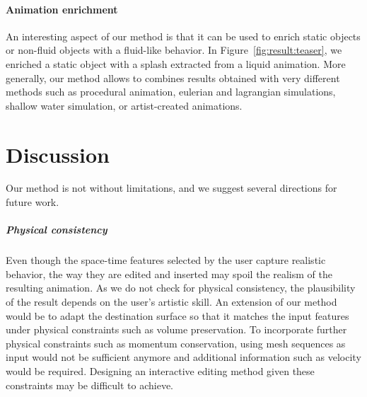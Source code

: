 \documentclass[review]{acmsiggraph}
\begin{document}
\paragraph{Animation enrichment}

An interesting aspect of our method is that it can be used to enrich static objects or non-fluid objects with a fluid-like behavior. 
In Figure~\ref{fig:result:teaser}, we enriched a static object with a splash extracted from a liquid animation.
More generally, our method allows to combines results obtained with very different methods such as procedural animation, eulerian and lagrangian simulations, shallow water simulation, or artist-created animations.




\section{Discussion} \label{sec:discussion}

Our method is not without limitations, and we suggest several directions for future work.

\subparagraph{Physical consistency} 
Even though the space-time features selected by the user capture realistic behavior, the way they are edited and inserted may spoil the realism of the resulting animation. 
As we do not check for physical consistency, the plausibility of the result depends on the user's artistic skill. 
An extension of our method would be to adapt the destination surface so that it matches the input features under physical constraints such as volume preservation. 
To incorporate further physical constraints such as momentum conservation, using mesh sequences as input would not be sufficient anymore and additional information such as velocity would be required. 
Designing an interactive editing method given these constraints may be difficult to achieve.
\end{document}
